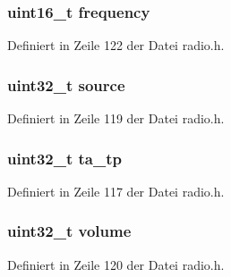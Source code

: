 \subsubsection[{frequency}]{\setlength{\rightskip}{0pt plus 5cm}uint16\+\_\+t frequency}\label{structradio__settings_aea762e0e67fcafaf5b3cd61201769926}


Definiert in Zeile 122 der Datei radio.\+h.

\hypertarget{structradio__settings_acced9a05ed6f381d74d67de65d66fa3b}{}
\subsubsection[{source}]{\setlength{\rightskip}{0pt plus 5cm}uint32\+\_\+t source}\label{structradio__settings_acced9a05ed6f381d74d67de65d66fa3b}


Definiert in Zeile 119 der Datei radio.\+h.

\hypertarget{structradio__settings_a104f6012667fb7152790a5a6f55c7781}{}
\subsubsection[{ta\+\_\+tp}]{\setlength{\rightskip}{0pt plus 5cm}uint32\+\_\+t ta\+\_\+tp}\label{structradio__settings_a104f6012667fb7152790a5a6f55c7781}


Definiert in Zeile 117 der Datei radio.\+h.

\hypertarget{structradio__settings_ae2b7935b01cdfe9a81d408dc3f2431f1}{}
\subsubsection[{volume}]{\setlength{\rightskip}{0pt plus 5cm}uint32\+\_\+t volume}\label{structradio__settings_ae2b7935b01cdfe9a81d408dc3f2431f1}


Definiert in Zeile 120 der Datei radio.\+h.

\hypertarget{structradio__settings_a22b4bf888b705c01b6914d4caaed08dd}{}
